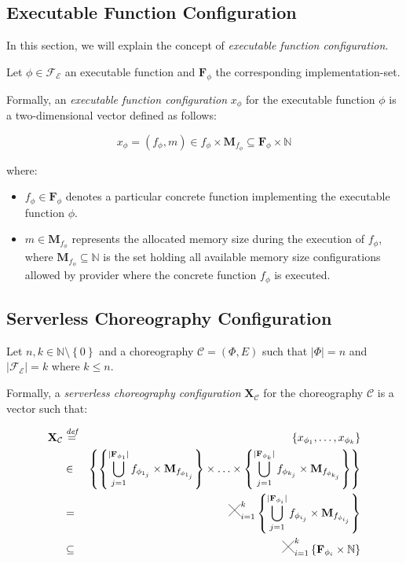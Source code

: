 \documentclass[12pt,a4paper]{report}
\newcommand{\Cross}{\mathbin{\tikz [x=2.5ex,y=2.5ex,line width=.10ex] \draw (0,0) -- (1,1) (0,1) -- (1,0);}}
\newcommand*{\N}{\mathbb{N}}
\newcommand{\mathDef}{\overset{\textit{def}}{=}}
\theoremstyle{definition}
\begin{document}
\subsection{Executable Function Configuration}

In this section, we will explain the concept of \textit{executable function configuration}. 

Let $\phi \in \mathscr{F_E}$ an executable function and $\textbf{F}_{\phi}$ the corresponding implementation-set.

Formally, an \textit{executable function configuration} $x_{\phi}$ for the executable function $\phi$ is a two-dimensional vector defined as follows:

\begin{equation}
	x_{\phi} = (f_{\phi},m) \in f_{\phi} \times \textbf{M}_{f_{\phi}} \subseteq \textbf{F}_{\phi} \times \N
\end{equation}

where:

\begin{itemize}
	\item $f_{\phi} \in \textbf{F}_{\phi}$  denotes a particular concrete function implementing the executable function $\phi$.
	\item $m \in \textbf{M}_{f_{\phi}}$ represents the allocated memory size during the execution of $f_{\phi}$, where $\textbf{M}_{f_{\phi}} \subseteq \N$ is the set holding all available memory size configurations allowed by provider where the concrete function $f_{\phi}$ is executed.
\end{itemize}

\subsection{Serverless Choreography Configuration}

Let $n,k \in \N \setminus \left\lbrace 0 \right\rbrace$ and a choreography $\mathcal{C} = (\Phi,E)$ such that $|\Phi| = n$ and $|\mathscr{F_E}| = k$ where $k \leq n$.

Formally, a \textit{serverless choreography configuration} $\textbf{X}_{\mathcal{C}}$ for the choreography $\mathcal{C}$ is a vector such that:

\begin{eqnarray}
	\textbf{X}_{\mathcal{C}} & \mathDef & \left\lbrace x_{\phi_{1}}, \ldots, x_{\phi_{k}} \right\rbrace \nonumber \\ 
	& \in & \left\{  \left\{ \bigcup_{j=1}^{|\textbf{F}_{\phi_{1}}|} f_{\phi_{1_j}} \times \textbf{M}_{f_{\phi_{1_j}}} \right\} \times \ldots \times \left\{ \bigcup_{j=1}^{|\textbf{F}_{\phi_{k}}|} f_{\phi_{k_j}} \times \textbf{M}_{f_{\phi_{k_j}}} \right\} \right\}  \nonumber \\
	& = & \Cross_{i = 1}^k \left\{ \bigcup_{j=1}^{|\textbf{F}_{\phi_{i}}|} f_{\phi_{i_j}} \times \textbf{M}_{f_{\phi_{i_j}}} \right\} \nonumber \\
	& \subseteq & \Cross_{i = 1}^k \left\{ \textbf{F}_{\phi_{i}} \times \mathbb{N} \right\}
\end{eqnarray}
\end{document}
